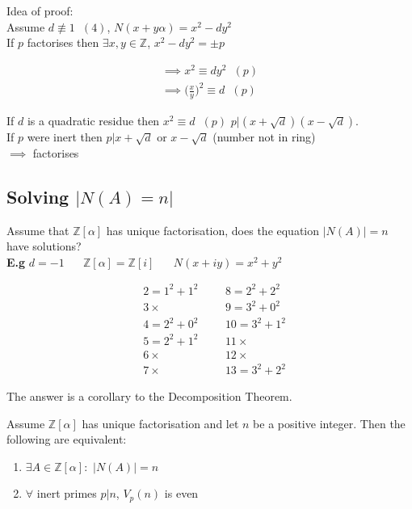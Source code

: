 \documentclass[11pt]{article}
\begin{document}
Idea of proof:\\[1em]

Assume $d\not \equiv 1 \hspace{7pt} (4)$, $N(x+y\alpha) = x^2-dy^2 $\\[0.5em]

If $p$ factorises then $\exists x,y \in \mathbb{Z}$, $ x^2-dy^2 = \pm p$ 


\begin{align*}
	\implies x^2 \equiv dy^2 \hspace{7pt} (p)\\
	\implies \Big(\frac{x}{y}\Big)^2 \equiv d \hspace{7pt} (p)
\end{align*}


If $d$ is a quadratic residue then $x^2 \equiv d \hspace{7pt} (p) $\hspace{15pt} $p | (x+\sqrt{d})(x-\sqrt{d})$.\\[0.5em]

If $p$ were inert then $p| x+\sqrt{d} $ or $x-\sqrt{d}$ \lightning \hspace{15pt}(number not in ring) \\
$\implies $ factorises



\subsection{Solving $|N(A) = n |$}

Assume that $\mathbb{Z}[\alpha]$ has unique factorisation, does the equation $|N(A)| = n $ have solutions?\\[1em]


\textbf{E.g} $d= -1 \hspace{20pt} \mathbb{Z}[\alpha] = \mathbb{Z}[i]  \hspace{20pt} N(x+iy)= x^2+ y^2$


\begin{align*}
	& 2= 1^2 + 1^2 && &8=2^2+2^2\\
	&3 \times && &9 = 3^2 +0^2\\
	&4 = 2^2 + 0^2 && &10 = 3^2 + 1^2\\
	&5 = 2^2+1^2 && &11 \times\\
	&6 \times && &12 \times\\
	&7 \times && &13 = 3^2 + 2^2
\end{align*}


The answer is a corollary to the Decomposition Theorem.
\begin{corollary}
	Assume $\mathbb{Z}[\alpha]$ has unique factorisation and let $n$ be a positive integer. Then the following are equivalent:

	\begin{enumerate}
		\item{$\exists A \in \mathbb{Z}[\alpha]: $ $ |N(A)| = n $}
		\item{$\forall $ inert primes $p|n$, $V_p(n)$ is even}
	\end{enumerate}
\end{corollary}
\end{document}
